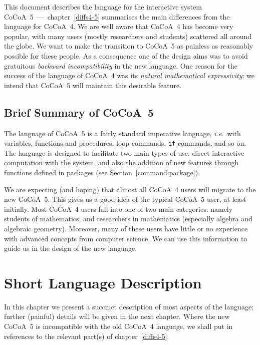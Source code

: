 \documentclass{book}[12,a4paper]
\def\ie{{\it i.e.}}
\begin{document}
This document describes the language for the interactive system
CoCoA~5~---~chapter~\ref{diffs4-5} summarises the main differences from the
language for CoCoA~4.  We are well aware that CoCoA~4 has become very
popular, with many users (mostly researchers and students) scattered all
around the globe.  We want to make the transition to CoCoA~5 as painless as
reasonably possible for these people.  As a consequence one of the design
aims was to avoid gratuitous \textit{backward incompatibility} in the new
language.  One reason for the success of the language of CoCoA~4 was its
\textit{natural mathematical expressivity}; we intend that CoCoA~5 will 
maintain this desirable feature.

\section{Brief Summary of CoCoA~5}

The language of CoCoA~5 is a fairly standard imperative language, \ie~with
variables, functions and procedures, loop commands, \texttt{if} commands,
and so on.  The language is designed to facilitate two main types of use:
direct interactive computation with the system, and also the addition of
new features through functions defined in packages
(see Section~\ref{command:package}).

We are expecting (and hoping) that almost all CoCoA~4 users will migrate to
the new CoCoA~5.  This gives us a good idea of the typical CoCoA~5 user, at
least initially.  Most CoCoA~4 users fall into one of two main categories:
namely students of mathematics, and researchers in mathematics (especially
algebra and algebraic geometry).  Moreover, many of these users have little
or no experience with advanced concepts from computer science.  We can use
this information to guide us in the design of the new language.





\chapter{Short Language Description}

In this chapter we present a succinct description of most aspects of the
language; further (painful) details will be given in the next chapter.
Where the new CoCoA~5 is incompatible with the old CoCoA~4 language, we shall
put in references to the relevant part(s) of chapter~\ref{diffs4-5}.
\end{document}
